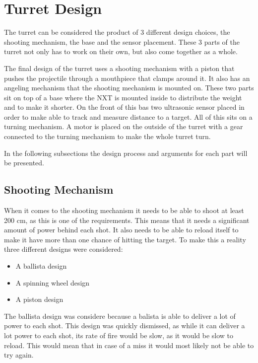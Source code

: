 \section{Turret Design}
The turret can be considered the product of 3 different design choices, the
shooting mechanism, the base and the sensor placement. These 3 parts of the
turret not only has to work on their own, but also come together as a whole.\nl

The final design of the turret uses a shooting mechanism with a piston
that pushes the projectile through a mouthpiece that clamps around it. It also has an angeling mechanism
that the shooting mechanism is mounted on. These two parts sit on top of a
base where the NXT is mounted inside to distribute the weight and to make it
shorter. On the front of this bas two ultrasonic sensor placed in order to make
\name able to track and measure distance to a target. All of this sits on a
turning mechanism. A motor is placed on the outside of the
turret with a gear connected to the turning mechanism to make the whole turret
turn. 

In the following subsections the design process and arguments for each part will
be presented.

\subsection{Shooting Mechanism}
When it comes to the shooting mechanism it needs to be able to shoot at least
200 cm, as this is one of the requirements. This means that it needs a
significant amount of power behind each shot. It also needs to be able to reload
itself to make it have more than one chance of hitting the target. To make this
a reality three different designs were considered:

\begin{itemize}
  \item A ballista design
  \item A spinning wheel design
  \item A piston design
\end{itemize}

The ballista design was considere because a balista is able to deliver a lot of
power to each shot.
This design was quickly dismissed, as while it can deliver a lot power to each
shot, its rate of fire would be slow, as it would be slow to reload. This would
mean that in case of a miss it would most likely not be able to try again.\nl

